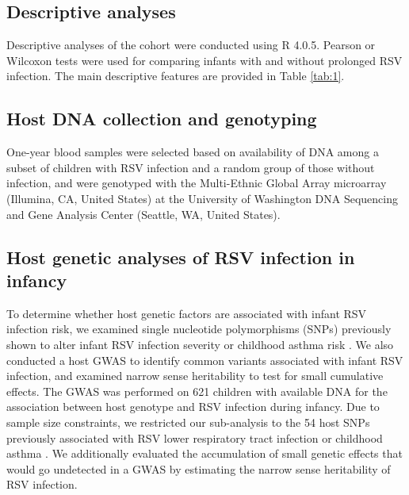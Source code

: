 \documentclass{article} %
\begin{document}
\subsection{Descriptive analyses}
Descriptive analyses of the cohort were conducted using R 4.0.5. 
Pearson or Wilcoxon tests were used for comparing infants with and without prolonged RSV infection. 
The main descriptive features are provided in Table \ref{tab:1}.

\subsection{Host DNA collection and genotyping}
One-year blood samples were selected based on availability of DNA among a subset of children with RSV infection and a random group of those without infection, and were genotyped with the Multi-Ethnic Global Array microarray (Illumina, CA, United States) at the University of Washington DNA Sequencing and Gene Analysis Center (Seattle, WA, United States).

\subsection{Host genetic analyses of RSV infection in infancy}
To determine whether host genetic factors are associated with infant RSV infection risk, we examined single nucleotide polymorphisms (SNPs) previously shown to alter infant RSV infection severity or childhood asthma risk \citep{janssen2007genetic, pasanen2017genome, pividori2019shared}.
We also conducted a host GWAS to identify common variants associated with infant RSV infection, and examined narrow sense heritability to test for small cumulative effects. The GWAS was performed on 621 children with available DNA for the association between host genotype and RSV infection during infancy. Due to sample size constraints, we restricted our sub-analysis to the 54 host SNPs previously associated with RSV lower respiratory tract infection or childhood asthma 
\citep{janssen2007genetic, pasanen2017genome, pividori2019shared}. 
We additionally evaluated the accumulation of small genetic effects that would go undetected in a GWAS by estimating the narrow sense heritability of RSV infection. 
\end{document}
